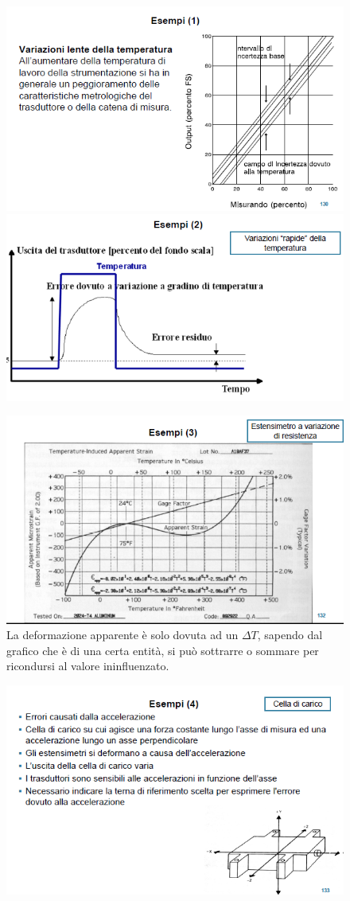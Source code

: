 \documentclass[a4paper, 15pt]{article}
\begin{document}
\begin{adjustwidth}{2in}{}
\begin{figure}[H]
	\centering
	\includegraphics[width=0.7\linewidth]{fig/screenshot036}
	\includegraphics[width=0.7\linewidth]{fig/screenshot037}
	\label{fig:screenshot036}
\end{figure}
\begin{figure}[H]
	\centering
	\includegraphics[width=0.7\linewidth]{fig/screenshot038}
	\caption{La deformazione apparente è solo dovuta ad un $\Delta T$, sapendo dal grafico che è di una certa entità, si può sottrarre o sommare per ricondursi al valore ininfluenzato.}
	\label{fig:screenshot038}
\end{figure}
\begin{figure}[H]
	\centering
	\includegraphics[width=0.7\linewidth]{fig/screenshot039}


\end{figure}
\end{adjustwidth}
\end{document}
